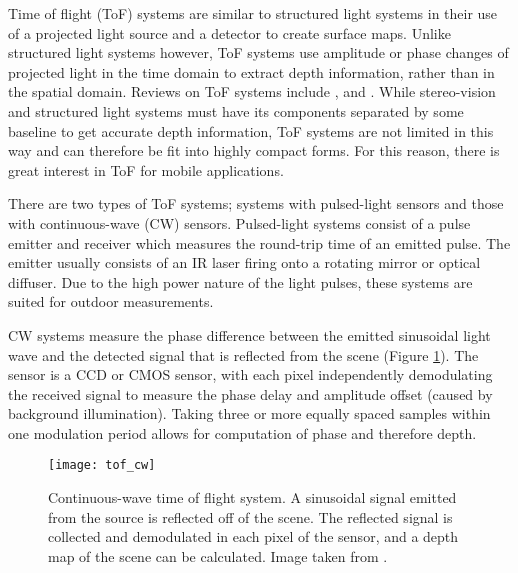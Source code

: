 \documentclass[class=article, crop=false]{standalone}
\begin{document}
Time of flight (ToF) systems are similar to structured light systems in their use of a projected light source and a detector to create surface maps. Unlike structured light systems however, ToF systems use amplitude or phase changes of projected light in the time domain to extract depth information, rather than in the spatial domain. Reviews on ToF systems include \cite{Horaud2016}, \cite{tofbook} and \cite{Kolb2010}. While stereo-vision and structured light systems must have its components separated by some baseline to get accurate depth information, ToF systems are not limited in this way and can therefore be fit into highly compact forms. For this reason, there is great interest in ToF for mobile applications.
\par 
There are two types of ToF systems; systems with pulsed-light sensors and those with continuous-wave (CW) sensors. Pulsed-light systems consist of a pulse emitter and receiver which measures the round-trip time of an emitted pulse. The emitter usually consists of an IR laser firing onto a rotating mirror or optical diffuser. Due to the high power nature of the light pulses, these systems are suited for outdoor measurements.
\par 
CW systems measure the phase difference between the emitted sinusoidal light wave and the detected signal that is reflected from the scene (Figure \ref{tof_cw}). The sensor is a CCD or CMOS sensor, with each pixel independently demodulating the received signal to measure the phase delay and amplitude offset (caused by background illumination). Taking three or more equally spaced samples within one modulation period allows for computation of phase and therefore depth.

\begin{figure}[!h]
	\centering
	\texttt{[image: tof\_cw]}
	\caption{Continuous-wave time of flight system. A sinusoidal signal emitted from the source is reflected off of the scene. The reflected signal is collected and demodulated in each pixel of the sensor, and a depth map of the scene can be calculated. Image taken from \parencite{Kolb2010}.}
	\label{tof_cw}
\end{figure}
\end{document}
